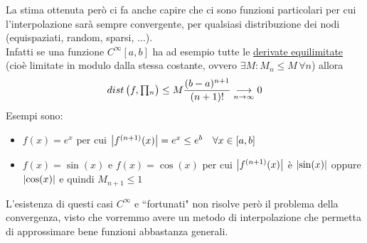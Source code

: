 La stima ottenuta però ci fa anche capire che ci sono funzioni particolari per cui l'interpolazione sarà sempre convergente, per qualsiasi distribuzione dei nodi (equispaziati, random, sparsi, $\dotso$).\\
Infatti se una funzione $C^{\infty}[a,b]$ ha ad esempio tutte le \uline{derivate equilimitate} (cioè limitate in modulo dalla stessa costante, ovvero $\exists M : M_n \le M \, \forall n$) allora
\[dist\left(f,\inter_n \right) \le M \frac{(b-a)^{n+1}}{(n+1)!} \underset{n \to \infty}{\longrightarrow} 0\]
Esempi sono:
\begin{itemize}
    \item $f(x)=e^x$ per cui $\abs*{f^{(n+1)}(x)} = e^x \le e^b \quad \forall x \in [a,b]$
    \item $f(x)=\sin (x)$ e $f(x)=\cos (x)$ per cui $\abs*{f^{(n+1)}(x)}$ è $\abs*{\sin(x)}$ oppure $\abs*{\cos(x)}$ e quindi $M_{n+1} \le 1$
\end{itemize}
L'esistenza di questi casi $C^{\infty}$ e ``fortunati" non risolve però il problema della convergenza, visto che vorremmo avere un metodo di interpolazione che permetta di approssimare bene funzioni abbastanza generali.


